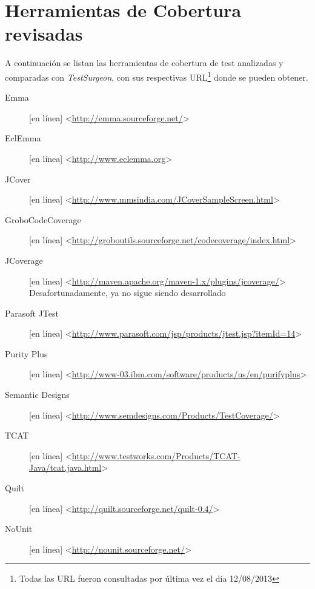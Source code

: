 \chapter{Herramientas de Cobertura revisadas}

\par A continuación se listan las herramientas de cobertura de test analizadas y comparadas con \emph{TestSurgeon}, con sus respectivas URL\footnote{Todas las URL fueron consultadas por última vez el día 12/08/2013} donde se pueden obtener.
\begin{description}
\item[Emma] [en línea] \textless\url{http://emma.sourceforge.net/}\textgreater  \\
\item[EclEmma] [en línea] \textless\url{http://www.eclemma.org}\textgreater  \\
\item[JCover] [en línea] \textless\url{http://www.mmsindia.com/JCoverSampleScreen.html}\textgreater  \\
\item[GroboCodeCoverage] [en línea] \textless\url{http://groboutils.sourceforge.net/codecoverage/index.html}\textgreater  \\
\item[JCoverage] [en línea] \textless\url{http://maven.apache.org/maven-1.x/plugins/jcoverage/}\textgreater   $\quad$ Desafortunadamente, ya no sigue siendo desarrollado \\
\item[Parasoft JTest] [en línea] \textless\url{http://www.parasoft.com/jsp/products/jtest.jsp?itemId=14}\textgreater  \\
\item[Purity Plus] [en línea] \textless\url{http://www-03.ibm.com/software/products/us/en/purifyplus}\textgreater  \\
\item[Semantic Designs] [en línea] \textless\url{http://www.semdesigns.com/Products/TestCoverage/}\textgreater  \\
\item[TCAT] [en línea] \textless\url{http://www.testworks.com/Products/TCAT-Java/tcat.java.html}\textgreater  \\
\item[Quilt] [en línea] \textless\url{http://quilt.sourceforge.net/quilt-0.4/}\textgreater   \\
\item[NoUnit] [en línea] \textless\url{http://nounit.sourceforge.net/}\textgreater   \\

\end{description}
